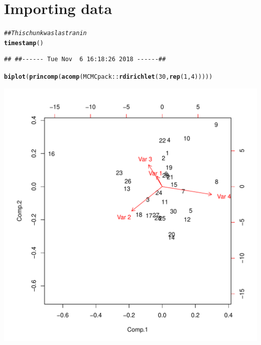 \documentclass{article}\usepackage[]{graphicx}\usepackage[]{color}
\makeatletter
\def\maxwidth{ %
  \ifdim\Gin@nat@width>\linewidth
    \linewidth
  \else
    \Gin@nat@width
  \fi
}
\newcommand{\hlnum}[1]{\textcolor[rgb]{0.686,0.059,0.569}{#1}}%
\newcommand{\hlcom}[1]{\textcolor[rgb]{0.678,0.584,0.686}{\textit{#1}}}%
\newcommand{\hlopt}[1]{\textcolor[rgb]{0,0,0}{#1}}%
\newcommand{\hlstd}[1]{\textcolor[rgb]{0.345,0.345,0.345}{#1}}%
\newcommand{\hlkwd}[1]{\textcolor[rgb]{0.737,0.353,0.396}{\textbf{#1}}}%
\newenvironment{kframe}{%
 \def\at@end@of@kframe{}%
 \ifinner\ifhmode%
  \def\at@end@of@kframe{\end{minipage}}%
  \begin{minipage}{\columnwidth}%
 \fi\fi%
 \def\FrameCommand##1{\hskip\@totalleftmargin \hskip-\fboxsep
 \colorbox{shadecolor}{##1}\hskip-\fboxsep
     \hskip-\linewidth \hskip-\@totalleftmargin \hskip\columnwidth}%
 \MakeFramed {\advance\hsize-\width
   \@totalleftmargin\z@ \linewidth\hsize
   \@setminipage}}%
 {\par\unskip\endMakeFramed%
 \at@end@of@kframe}
\newenvironment{knitrout}{}{} %
\makeatother
\begin{document}
\section{Importing data}
\begin{knitrout}
\color{fgcolor}\begin{kframe}
\begin{alltt}
\hlcom{## This chunk was last ran in}
\hlkwd{timestamp}\hlstd{()}
\end{alltt}
\begin{verbatim}
## ##------ Tue Nov  6 16:18:26 2018 ------##
\end{verbatim}
\begin{alltt}
\hlkwd{biplot}\hlstd{(}\hlkwd{princomp}\hlstd{(}\hlkwd{acomp}\hlstd{(MCMCpack}\hlopt{::}\hlkwd{rdirichlet}\hlstd{(}\hlnum{30}\hlstd{,} \hlkwd{rep}\hlstd{(}\hlnum{1}\hlstd{,} \hlnum{4}\hlstd{)))))}
\end{alltt}
\end{kframe}
\includegraphics[width=\maxwidth]{figure/unnamed-chunk-6-1} 

\end{knitrout}
\end{document}
